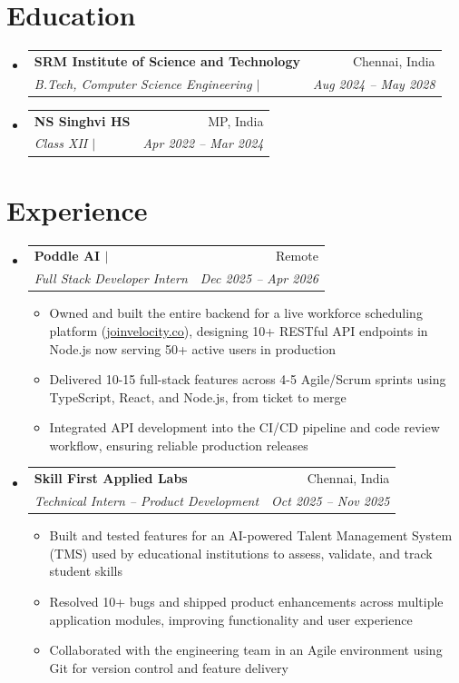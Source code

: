 \documentclass[letterpaper,10pt]{article}
\makeatletter
\newcommand{\resumeItem}[1]{
  \item\small{#1 \vspace{-1pt}}
}
\newcommand{\resumeSubheading}[4]{
  \vspace{1pt}\item
  \begin{tabular*}{0.97\textwidth}{l@{\extracolsep{\fill}}r}
    \textbf{#1} & \small{#2} \\
    \textit{\small{#3}} & \textit{\small{#4}} \\
  \end{tabular*}\vspace{-4pt}
}
\newcommand{\resumeSubHeadingListStart}{\begin{itemize}[leftmargin=0.15in, label={}, itemsep=2pt]}
\newcommand{\resumeSubHeadingListEnd}{\end{itemize}}
\newcommand{\resumeItemListStart}{\begin{itemize}[leftmargin=0.2in, label={$\bullet$}, itemsep=0pt, topsep=2pt]}
\newcommand{\resumeItemListEnd}{\end{itemize}\vspace{-2pt}}
\makeatother
\begin{document}
\section{Education}
\resumeSubHeadingListStart
  \resumeSubheading
    {SRM Institute of Science and Technology}{Chennai, India}
    {B.Tech, Computer Science Engineering $|$ \normalfont{CGPA: 9.16}}{Aug 2024 -- May 2028}
  \resumeSubheading
    {NS Singhvi HS}{MP, India}
    {Class XII $|$ \normalfont{Score: 80\%}}{Apr 2022 -- Mar 2024}
\resumeSubHeadingListEnd

\section{Experience}
\resumeSubHeadingListStart

  \resumeSubheading
    {Poddle AI \normalfont{-- UC Berkeley-established startup} $|$ \normalfont{\href{https://github.com/velocityai588-tech/NEW_Velocity_AI.git}{\underline{GitHub}} $|$ \href{https://www.joinvelocity.co/}{\underline{Live Demo}}}}{Remote}
    {Full Stack Developer Intern}{Dec 2025 -- Apr 2026}
    \resumeItemListStart
      \resumeItem{Owned and built the entire backend for a live workforce scheduling platform (\href{https://www.joinvelocity.co/}{\underline{joinvelocity.co}}), designing 10+ RESTful API endpoints in Node.js now serving 50+ active users in production}
      \resumeItem{Delivered 10-15 full-stack features across 4-5 Agile/Scrum sprints using TypeScript, React, and Node.js, from ticket to merge}
      \resumeItem{Integrated API development into the CI/CD pipeline and code review workflow, ensuring reliable production releases}
    \resumeItemListEnd

  \resumeSubheading
    {Skill First Applied Labs}{Chennai, India}
    {Technical Intern -- Product Development}{Oct 2025 -- Nov 2025}
    \resumeItemListStart
      \resumeItem{Built and tested features for an AI-powered Talent Management System (TMS) used by educational institutions to assess, validate, and track student skills}
      \resumeItem{Resolved 10+ bugs and shipped product enhancements across multiple application modules, improving functionality and user experience}
      \resumeItem{Collaborated with the engineering team in an Agile environment using Git for version control and feature delivery}
    \resumeItemListEnd

\resumeSubHeadingListEnd

\end{document}
